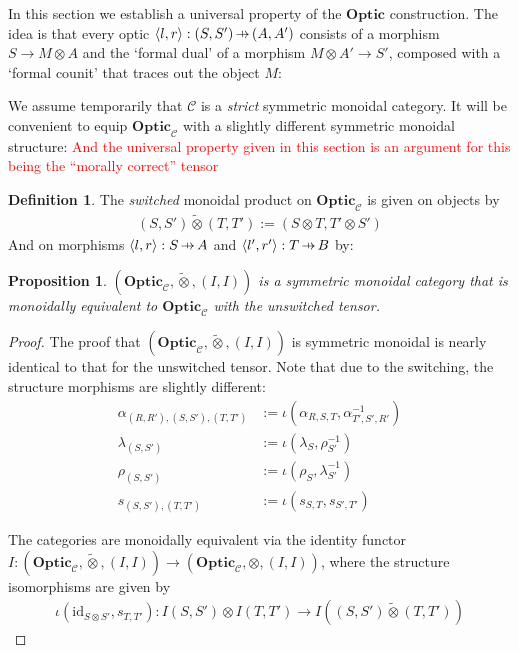 \documentclass[11pt,a4paper]{article}
\theoremstyle{plain}
\newtheorem{proposition}[theorem]{Proposition}
\theoremstyle{definition}
\newtheorem{definition}[theorem]{Definition}
\newcommand{\C}{\mathscr{C}}
\newcommand{\Optic}{\mathbf{Optic}}
\newcommand{\switched}{\mathbin{\tilde{\otimes}}}
\newcommand{\id}{\mathrm{id}}
\newcommand{\hto}{\ensuremath{\,\mathaccent\shortmid\rightarrow\,}}
\newcommand{\todo}[1]{\textcolor{red}{\small #1}}
\begin{document}
In this section we establish a universal property of the $\Optic$ construction. The idea is that every optic $\langle l, r\rangle : (S, S') \hto (A, A')$ consists of a morphism $S \to M \otimes A$ and the `formal dual' of a morphism $M \otimes A' \to S'$, composed with a `formal counit' that traces out the object $M$:
\begin{center}

\end{center}

We assume temporarily that $\C$ is a \emph{strict} symmetric monoidal category. It will be convenient to equip $\Optic_\C$ with a slightly different symmetric monoidal structure: \todo{And the universal property given in this section is an argument for this being the ``morally correct'' tensor}

\begin{definition}
The \emph{switched} monoidal product on $\Optic_\C$ is given on objects by 
\begin{align*}
(S, S') \switched (T, T') := (S \otimes T, T' \otimes S')
\end{align*}
And on morphisms $\langle l, r \rangle : S \hto A$ and $\langle l', r' \rangle : T \hto B$ by:
\begin{center}

\end{center}
\end{definition}

\begin{proposition}
$(\Optic_\C, \switched, (I, I))$ is a symmetric monoidal category that is monoidally equivalent to $\Optic_\C$ with the unswitched tensor.
\end{proposition}
\begin{proof}
The proof that $(\Optic_\C, \switched, (I, I))$ is symmetric monoidal is nearly identical to that for the unswitched tensor. Note that due to the switching, the structure morphisms are slightly different:
\begin{align*}
\alpha_{(R, R'), (S, S'), (T, T')} &:= \iota(\alpha_{R,S,T}, \alpha_{T',S',R'}^{-1}) \\
\lambda_{(S, S')} &:= \iota(\lambda_{S}, \rho_{S'}^{-1}) \\
\rho_{(S, S')} &:= \iota(\rho_{S}, \lambda_{S'}^{-1}) \\
s_{(S, S'), (T, T')} &:= \iota(s_{S, T}, s_{S', T'})
\end{align*}

The categories are monoidally equivalent via the identity functor $I : (\Optic_\C, \switched, (I, I)) \to (\Optic_\C, \otimes, (I, I))$, where the structure isomorphisms are given by
\begin{align*}
\iota(\id_{S \otimes S'}, s_{T, T'}) : I(S, S') \otimes I(T, T') \to I((S, S') \switched (T, T'))
\end{align*}

\end{proof}
\end{document}
